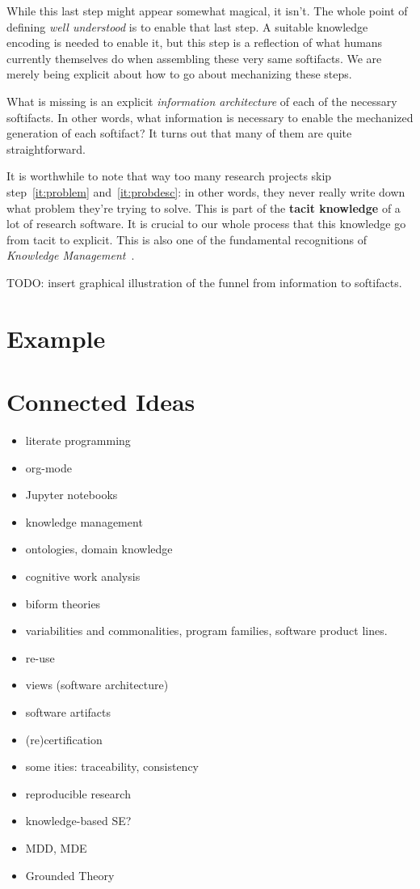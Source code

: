 \documentclass[10pt,twoside,onecolumn,openany,letterpaper]{memoir}
\begin{document}
While this last step might appear somewhat magical, it isn't. The whole
point of defining \emph{well understood} is to enable that last step. A
suitable knowledge encoding is needed to enable it, but this step is a
reflection of what humans currently themselves do when assembling these very
same softifacts. We are merely being explicit about how to go about
mechanizing these steps.

What is missing is an explicit \emph{information architecture} of each of
the necessary softifacts. In other words, what information is necessary to
enable the mechanized generation of each softifact? It turns out that many
of them are quite straightforward.

It is worthwhile to note that way too many research projects skip
step~\ref{it:problem} and~\ref{it:probdesc}: in other words, they never really
write down what problem they're trying to solve. This is part of the
\textbf{tacit knowledge} of a lot of research software.  It is crucial to our
whole process that this knowledge go from tacit to explicit. This is also one
of the fundamental recognitions of \emph{Knowledge
Management}~\cite{KM-textbook}.

TODO: insert graphical illustration of the funnel from information to
softifacts.

\chapter{Example}\label{ch:example}

\chapter{Connected Ideas}\label{ch:ideas}


\begin{itemize}
\item literate programming
\item org-mode
\item Jupyter notebooks
\item knowledge management
\item ontologies, domain knowledge
\item cognitive work analysis
\item biform theories
\item variabilities and commonalities, program families,
software product lines.
\item re-use
\item views (software architecture)
\item software artifacts
\item (re)certification
\item some ities: traceability, consistency
\item reproducible research
\item knowledge-based SE?
\item MDD, MDE
\item Grounded Theory
\end{itemize}
\end{document}
